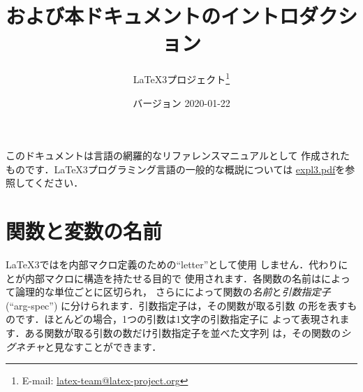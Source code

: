 \documentclass[uplatex,dvipdfmx,full,kernel]{wtpl3doc}
\begin{document}
\title{および本ドキュメントのイントロダクション}
\author{%
 \LaTeX3プロジェクト\thanks
   {%
     E-mail:
       \href{mailto:latex-team@latex-project.org}
         {latex-team@latex-project.org}%
   }%
}
\date{バージョン 2020-01-22}

\maketitle

このドキュメントは言語の網羅的なリファレンスマニュアルとして
作成されたものです．\LaTeX3プログラミング言語の一般的な概説については
\href{expl3.pdf}{expl3.pdf}を参照してください．

\section{関数と変数の名前}

\LaTeX3ではを内部マクロ定義のための\enquote{letter}として使用
しません．代わりに\code{_}と\code{:}が内部マクロに構造を持たせる目的で
使用されます．各関数の名前は\code{_}によって論理的な単位ごとに区切られ，
さらに\code{:}によって関数の\emph{名前}と\emph{引数指定子}
(\enquote{arg-spec}) に分けられます．引数指定子は，その関数が取る引数
の形を表すものです．ほとんどの場合，1つの引数は1文字の引数指定子に
よって表現されます．ある関数が取る引数の数だけ引数指定子を並べた文字列
は，その関数の\emph{シグネチャ}と見なすことができます．
\end{document}
